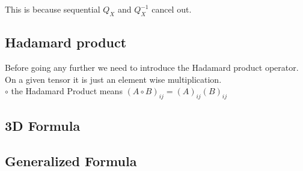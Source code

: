 \documentclass{article}
\begin{document}
This is because sequential $Q_X$ and $Q_X^{-1}$ cancel out.

\subsection{Hadamard product}

Before going any further we need to introduce the Hadamard product operator.
On a given tensor it is just an element wise multiplication. \\

$\circ$ the Hadamard Product means ${(A \circ B)}_{ij} = (A)_{ij} (B)_{ij}$ \\



\subsection{3D Formula}




\subsection{Generalized Formula}








\end{document}

